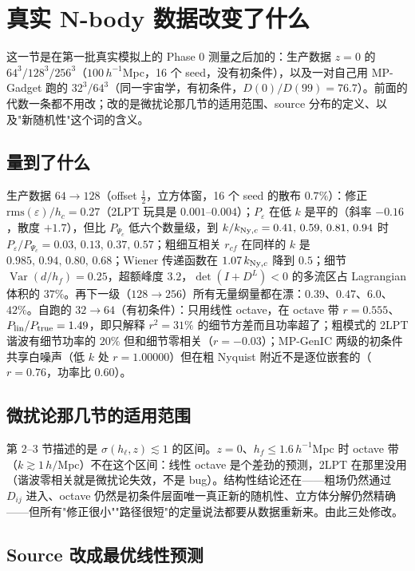 \documentclass[11pt,UTF8,fontset=none]{ctexart}
\newcommand{\Var}{\operatorname{Var}}
\newcommand{\Ny}{{\rm Ny}}
\begin{document}
\section{真实 N-body 数据改变了什么}\label{sec:real}

这一节是在第一批真实模拟上的 Phase 0 测量之后加的：生产数据 $z=0$ 的 $64^3/128^3/256^3$（$100\,h^{-1}$Mpc，16 个 seed，没有初条件），以及一对自己用 MP-Gadget 跑的 $32^3/64^3$（同一宇宙学，有初条件，$D(0)/D(99)=76.7$）。前面的代数一条都不用改；改的是微扰论那几节的适用范围、source 分布的定义、以及"新随机性"这个词的含义。

\subsection{量到了什么}

生产数据 $64\to128$（offset $\tfrac12$，立方体窗，16 个 seed 的散布 $0.7\%$）：修正 $\mathrm{rms}(\varepsilon)/h_c=0.27$（2LPT 玩具是 $0.001$--$0.004$）；$P_\varepsilon$ 在低 $k$ 是平的（斜率 $-0.16$，散度 $+1.7$），但比 $P_{\Psi_c}$ 低六个数量级，到 $k/k_{\Ny,c}=0.41,\,0.59,\,0.81,\,0.94$ 时 $P_\varepsilon/P_{\Psi_c}=0.03,\,0.13,\,0.37,\,0.57$；粗细互相关 $r_{cf}$ 在同样的 $k$ 是 $0.985,\,0.94,\,0.80,\,0.68$；Wiener 传递函数在 $1.07\,k_{\Ny,c}$ 降到 $0.5$；细节 $\Var(d/h_f)=0.25$，超额峰度 $3.2$，$\det(I+D^L)<0$ 的多流区占 Lagrangian 体积的 $37\%$。再下一级（$128\to256$）所有无量纲量都在漂：$0.39$、$0.47$、$6.0$、$42\%$。自跑的 $32\to64$（有初条件）：只用线性 octave，在 octave 带 $r=0.555$、$P_{\rm lin}/P_{\rm true}=1.49$，即只解释 $r^2=31\%$ 的细节方差而且功率超了；粗模式的 2LPT 谐波有细节功率的 $20\%$ 但和细节零相关（$r=-0.03$）；MP-GenIC 两级的初条件共享白噪声（低 $k$ 处 $r=1.00000$）但在粗 Nyquist 附近不是逐位嵌套的（$r=0.76$，功率比 $0.60$）。

\subsection{微扰论那几节的适用范围}

第 2--3 节描述的是 $\sigma(h_\ell,z)\lesssim1$ 的区间。$z=0$、$h_f\le1.6\,h^{-1}$Mpc 时 octave 带（$k\gtrsim1\,h/$Mpc）不在这个区间：线性 octave 是个差劲的预测，2LPT 在那里没用（谐波零相关就是微扰论失效，不是 bug）。结构性结论还在——粗场仍然通过 $D_{ij}$ 进入、octave 仍然是初条件层面唯一真正新的随机性、立方体分解仍然精确——但所有"修正很小""路径很短"的定量说法都要从数据重新来。由此三处修改。

\subsection{Source 改成最优线性预测}
\end{document}
